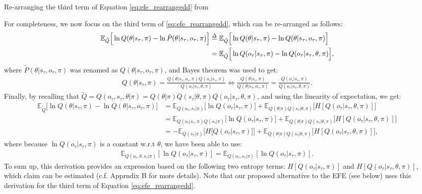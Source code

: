 \documentclass[twoside,11pt]{article}
\makeatletter
\def\delequal{\mathrel{\ensurestackMath{\stackon[1pt]{=}{\scriptstyle\Delta}}}}
\newcounter{subsubsubsection}[subsubsection]
\def\subsubsubsection{\@startsection
     {subsubsubsection}{4}{\z@} {-3.25ex plus -1
     ex minus -.2ex}{1.5ex plus .2ex}{\normalsize\bf}}
\makeatother
\begin{document}
\subsubsubsection{Re-arranging the third term of Equation \eqref{eq:efe_rearrangedd} from \citet{DeepAIwithMCMC}}

For completeness, we now focus on the third term of \eqref{eq:efe_rearrangedd}, which can be re-arranged as follows:
\begin{align*}
\mathbb{E}_{\tilde{Q}}\Big[ \ln Q(\theta|s_\tau, \pi) - \ln \tilde{P}(\theta|s_\tau,o_\tau,\pi) \Big] &\delequal \mathbb{E}_{\tilde{Q}}\Big[ \ln Q(\theta|s_\tau, \pi) - \ln Q(\theta|s_\tau,o_\tau,\pi) \Big] \\
&= \mathbb{E}_{\tilde{Q}}\Big[ \ln Q(o_\tau|s_\tau, \pi) - \ln Q(o_\tau|s_\tau,\theta,\pi) \Big],
\end{align*}
where $\tilde{P}(\theta|s_\tau,o_\tau,\pi)$ was renamed as $Q(\theta|s_\tau,o_\tau,\pi)$, and Bayes theorem was used to get:
\begin{align*}
Q(\theta|s_\tau, \pi)
= \frac{Q(\theta|s_\tau,o_\tau,\pi)Q(o_\tau|s_\tau, \pi)}{Q(o_\tau|s_\tau,\theta,\pi)} \Leftrightarrow \frac{Q(\theta|s_\tau, \pi)}{Q(\theta|s_\tau,o_\tau,\pi)}
= \frac{Q(o_\tau|s_\tau, \pi)}{Q(o_\tau|s_\tau,\theta,\pi)}.
\end{align*}
Finally, by recalling that $\tilde{Q} = Q(o_\tau, s_\tau, \theta|\pi) = Q(\theta|\pi)Q(s_\tau|\theta,\pi)Q(o_\tau|s_\tau,\theta,\pi)$, and using the linearity of expectation, we get:
\begin{align*}
\mathbb{E}_{\tilde{Q}}\Big[ \ln Q(\theta|s_\tau, \pi) - \ln Q(\theta|s_\tau,o_\tau,\pi) \Big] &= \mathbb{E}_{Q(o_\tau,s_\tau|\pi)}\Big[ \ln Q(o_\tau|s_\tau, \pi)\Big] + \mathbb{E}_{Q(\theta|\pi)Q(s_\tau|\theta,\pi)}\Big[H[Q(o_\tau|s_\tau,\theta,\pi)] \Big]\\
&= \mathbb{E}_{Q(o_\tau|s_\tau,\pi)Q(s_\tau|\pi)}\Big[ \ln Q(o_\tau|s_\tau, \pi)\Big] + \mathbb{E}_{Q(\theta|\pi)Q(s_\tau|\theta,\pi)}\Big[H[Q(o_\tau|s_\tau,\theta,\pi)] \Big]\\
&= - \mathbb{E}_{Q(s_\tau|\pi)}\Big[ H\big[ Q(o_\tau|s_\tau, \pi) \big] \Big] + \mathbb{E}_{Q(\theta|\pi)Q(s_\tau|\theta,\pi)}\Big[H[Q(o_\tau|s_\tau,\theta,\pi)] \Big],
\end{align*}
where because $\ln Q(o_\tau|s_\tau, \pi)$ is a constant w.r.t $\theta$, we have been able to use:
\begin{align*}
\mathbb{E}_{Q(o_\tau,\theta,s_\tau|\pi)}[ \ln Q(o_\tau|s_\tau, \pi)] = \mathbb{E}_{Q(o_\tau,s_\tau|\pi)}[ \ln Q(o_\tau|s_\tau, \pi)].
\end{align*}
To sum up, this derivation provides an expression based on the following two entropy terms: $H[ Q(o_\tau|s_\tau, \pi) ]$ and $H[Q(o_\tau|s_\tau,\theta,\pi)]$, which \citet{DeepAIwithMCMC} claim can be estimated (c.f. Apprndix B for more details). Note that our proposed alternative to the EFE (see below) uses this derivation for the third term of Equation \eqref{eq:efe_rearrangedd}.
\end{document}
